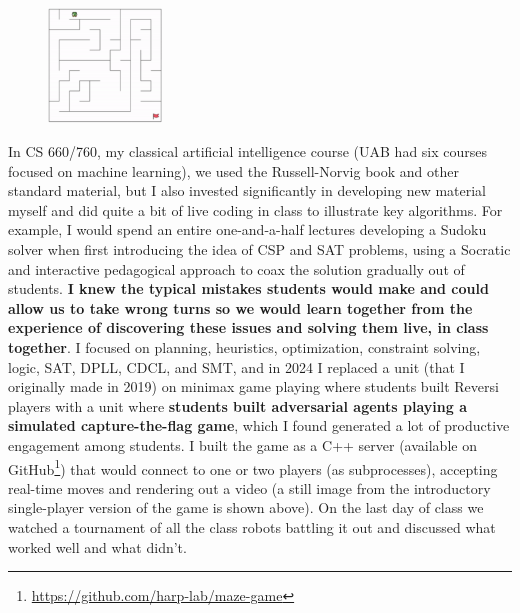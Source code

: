 \documentclass[12pt]{article}
\begin{document}
\begin{figure}
  \vspace{-1.00cm}
  \includegraphics[width=0.27\textwidth]{mazepic.png}
  \vspace{-0.85cm}
\end{figure}
In CS 660/760, my classical artificial intelligence course (UAB had six courses focused on machine learning), we used the Russell-Norvig book and other standard material, but I also invested significantly in developing new material myself and did quite a bit of live coding in class to illustrate key algorithms. For example, I would spend an entire one-and-a-half lectures developing a Sudoku solver when first introducing the idea of CSP and SAT problems, using a Socratic and interactive pedagogical approach to coax the solution gradually out of students. \textbf{I knew the typical mistakes students would make and could allow us to take wrong turns so we would learn together from the experience of discovering these issues and solving them live, in class together}. I focused on planning, heuristics, optimization, constraint solving, logic, SAT, DPLL, CDCL, and SMT, and in 2024 I replaced a unit (that I originally made in 2019) on minimax game playing where students built Reversi players with a unit where \textbf{students built adversarial agents playing a simulated capture-the-flag game}, which I found generated a lot of productive engagement among students. I built the game as a C++ server (available on GitHub\footnote{\url{https://github.com/harp-lab/maze-game}}) that would connect to one or two players (as subprocesses), accepting real-time moves and rendering out a video (a still image from the introductory single-player version of the game is shown above). On the last day of class we watched a tournament of all the class robots battling it out and discussed what worked well and what didn't.
\end{document}
